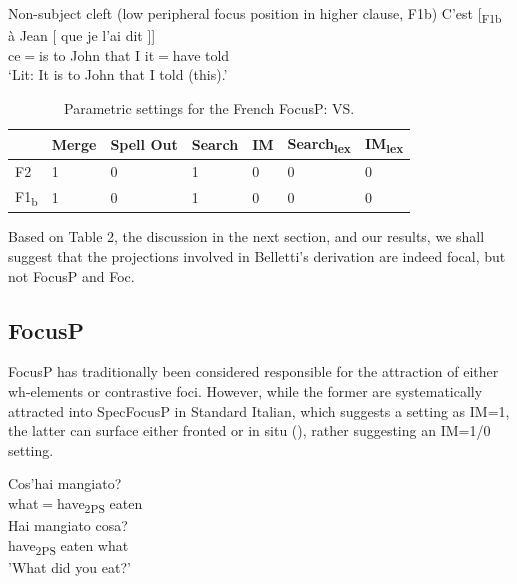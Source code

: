 \documentclass[fleqn,10pt]{wlscirep}
\begin{document}
\begin{exe}
    \ex	Non-subject cleft (low peripheral focus position in higher clause, F1b)
        \gll {[} C'est {[}\textsubscript{F1b} à Jean {[} que je l'ai dit {]]}\\
        {} ce$=$is 		{}	to John			{}		that I it$=$have told {} \\
        \vspace*{-3mm}
        \glt ‘Lit: It is to John that I told (this).’
\end{exe}


\begin{table}[H]
    \centering
    \begin{tabular}{|l|l|l|l|l|l|l|}
    \hline
    & Merge & Spell Out & Search & IM & Search\textsubscript{lex} & IM\textsubscript{lex} \\
    \hline
    F2 & 1 & 0 & 1 & 0 & 0 & 0 \\
    \hline
    F1\textsubscript{b} & 1 & 0 & 1 & 0 & 0 & 0 \\
    \hline
    \end{tabular}
    \caption{\label{tab:belletti}Parametric settings for the French FocusP: VS.}
\end{table}

\noindent Based on Table 2, the discussion in the next section, and our results, we shall suggest that the projections involved in Belletti's derivation are indeed focal, but not FocusP and Foc.

\subsection*{FocusP}

FocusP has traditionally been considered responsible for the attraction of either wh-elements or contrastive foci. 
However, while the former are systematically attracted into SpecFocusP in Standard Italian, which suggests a setting as IM=1, the latter can surface either fronted or in situ (\citealt{bianchi2013}), rather suggesting an IM=1/0 setting. 

\begin{exe}
    \ex
        \begin{xlist}
            \ex \gll Cos'hai mangiato?\\
            what$=$have\textsubscript{2PS} eaten\\
            \ex \gll * Hai mangiato cosa?\\
            {} have\textsubscript{2PS} eaten what\\
            \glt \hspace{2mm} 'What did you eat?'
        \end{xlist}
\end{exe}
\end{document}
